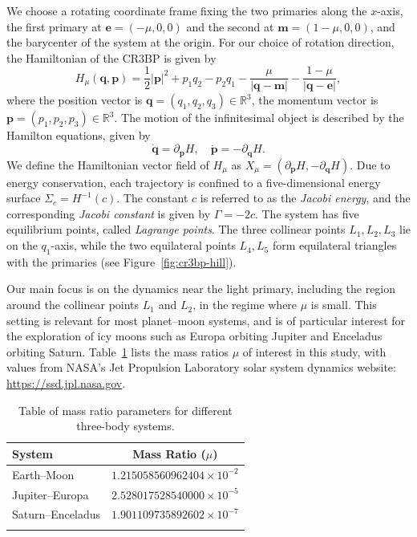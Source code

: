 \documentclass[pdflatex,sn-mathphys-ay]{sn-jnl}%
\theoremstyle{thmstyleone}%
\theoremstyle{thmstyletwo}%
\theoremstyle{thmstylethree}%
\begin{document}
We choose a rotating coordinate frame fixing the two primaries along the $x$-axis, the first primary at $\mathbf{e} = (-\mu, 0, 0)$ and the second at $\mathbf{m} = (1 - \mu, 0, 0)$, and the barycenter of the system at the origin. For our choice of rotation direction, the Hamiltonian of the CR3BP is given by
\begin{equation*}
    H_\mu(\mathbf{q}, \mathbf{p}) = \frac{1}{2}|\mathbf{p}|^2  + p_1q_2 - p_2q_1 - \frac{\mu}{|\mathbf{q} - \mathbf{m}|} - \frac{1 - \mu}{|\mathbf{q} - \mathbf{e}|},
\end{equation*}
where the position vector is $\mathbf{q} = (q_1, q_2, q_3) \in \mathbb{R}^3$, the momentum vector is $\mathbf{p} = (p_1, p_2, p_3) \in \mathbb{R}^3$.
The motion of the infinitesimal object is described by the Hamilton equations, given by 
\begin{equation*}
    \dot{\mathbf{q}} = \partial_{\mathbf{p}} H, \quad \dot{\mathbf{p}} = - \partial_{\mathbf{q}} H.
\end{equation*}
We define the Hamiltonian vector field of $H_\mu$ as $X_\mu = (\partial_{\mathbf{p}} H, -\partial_{\mathbf{q}} H)$.
Due to energy conservation, each trajectory is confined to a five-dimensional energy surface $\Sigma_c = H^{-1}(c)$. The constant $c$ is referred to as the \textit{Jacobi energy}, and the corresponding \textit{Jacobi constant} is given by $\Gamma = -2c$.
The system has five equilibrium points, called \emph{Lagrange points}. The three collinear points $L_1, L_2, L_3$ lie on the $q_1$-axis, while the two equilateral points $L_4, L_5$ form equilateral triangles with the primaries (see Figure~\ref{fig:cr3bp-hill}).

Our main focus is on the dynamics near the light primary, including the region around the collinear points $L_1$ and $L_2$, in the regime where $\mu$ is small. This setting is relevant for most planet--moon systems, and is of particular interest for the exploration of icy moons such as Europa orbiting Jupiter and Enceladus orbiting Saturn. Table~\ref{tbl:mass_ratios} lists the mass ratios $\mu$ of interest in this study, with values from NASA's Jet Propulsion Laboratory solar system dynamics website: \url{https://ssd.jpl.nasa.gov}.
\begin{table}[h!]
\caption{Table of mass ratio parameters for different three-body systems.}
\label{tbl:mass_ratios}
\begin{tabular}{l|c}
\toprule
\textbf{System} & \textbf{Mass Ratio ($\mu$)} \\
\midrule
Earth--Moon       & $1.215058560962404 \times 10^{-2}$ \\
Jupiter--Europa   & $2.528017528540000 \times 10^{-5}$ \\
Saturn--Enceladus & $1.901109735892602 \times 10^{-7}$ \\
\botrule
\end{tabular}
\end{table}
\end{document}
